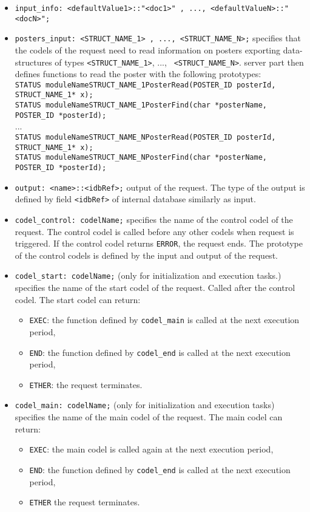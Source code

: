 \begin{itemize}
\item[]{\tt input\_info:  <defaultValue1>::"<doc1>" , ..., <defaultValueN>::"<docN>";}
\item[]{\tt posters\_input:  <STRUCT\_NAME\_1> , ..., <STRUCT\_NAME\_N>;}
specifies that the codels of the request need to read information on posters exporting
data-structures of types {\tt <STRUCT\_NAME\_1>}, ..., {\tt
  <STRUCT\_NAME\_N>}. {\GenoM} server part then defines functions to read
the poster with the following prototypes:\\{\small
{\tt STATUS moduleNameSTRUCT\_NAME\_1PosterRead(POSTER\_ID posterId,
  STRUCT\_NAME\_1* x);}\\
{\tt STATUS moduleNameSTRUCT\_NAME\_1PosterFind(char *posterName,
  POSTER\_ID *posterId);}\\
...\\
{\tt STATUS moduleNameSTRUCT\_NAME\_NPosterRead(POSTER\_ID posterId,
  STRUCT\_NAME\_1* x);}\\
{\tt STATUS moduleNameSTRUCT\_NAME\_NPosterFind(char *posterName,
  POSTER\_ID *posterId);}\\
}
\item[]{\tt output:  <name>::<idbRef>;} output of the request. The type of
the output is defined by field {\tt <idbRef>} of internal database
similarly as input.\\

\item[]{\tt codel\_control: codelName;} specifies the name of the
control codel of the request. The control codel is called before
any other codels when request is triggered. If the control codel returns {\tt ERROR}, the
request ends. The prototype of the control codels is defined by the
input and output of the request.

\item[]{\tt codel\_start: codelName;} (only for initialization and execution
tasks.) specifies the name of the start codel of the request. Called
after the control codel. The start codel can return:
\begin{itemize}
\item {\tt EXEC}: the function defined by {\tt codel\_main} is called
  at the next execution period,
\item {\tt END}: the function defined by {\tt codel\_end} is called at the
  next execution period,
\item {\tt ETHER}: the request terminates.
\end{itemize}

\item[]{\tt codel\_main: codelName;} (only for initialization and execution
tasks) specifies the name of the main codel of the request. The main
codel can return:
\begin{itemize}
\item {\tt EXEC}: the main codel is called again
  at the next execution period,
\item {\tt END}: the function defined by {\tt codel\_end} is called at the
  next execution period,
\item {\tt ETHER} the request terminates.
\end{itemize}


\end{itemize}
